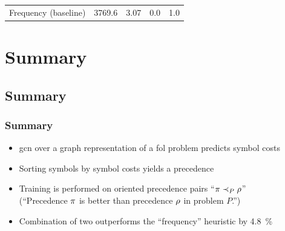 \documentclass[a4paper]{beamer}
\begin{document}
\begin{frame}
\begin{tabular}{l|ll|rl}




Frequency (baseline) &
\num{3769.6} &
\num{3.07} &
0.0 &
\num[round-mode=places,round-precision=3]{1.0} \\

\end{tabular}

\end{frame}

\section{Summary}
\subsection*{Summary}
\begin{frame}
\frametitle{Summary}
\begin{itemize}
\item \Acrshort{gcn} over a graph representation of a \acrshort{fol} problem predicts symbol costs
\item Sorting symbols by symbol costs yields a precedence
\item Training is performed on oriented precedence pairs ``$\pi \prec_{P} \rho$'' \\
(``Precedence $\pi$ is better than precedence $\rho$ in problem $P$.'')
\item Combination of two  outperforms the ``frequency'' heuristic by \SI{4.8}{\percent}
\end{itemize}
\end{frame}
\end{document}
